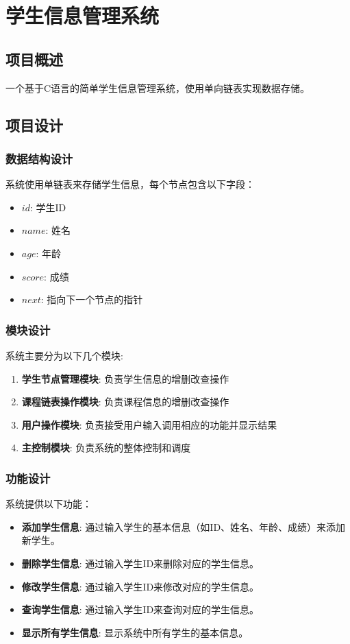 \chapter{学生信息管理系统}

\section{项目概述}
一个基于C语言的简单学生信息管理系统，使用单向链表实现数据存储。

\section{项目设计}
\subsection{数据结构设计}\label{sub:data_structure_design}
系统使用单链表来存储学生信息，每个节点包含以下字段：
\begin{itemize}
    \item $id$: 学生ID
    \item $name$: 姓名
    \item $age$: 年龄
    \item $score$: 成绩
    \item $next$: 指向下一个节点的指针
\end{itemize}

\subsection{模块设计}

系统主要分为以下几个模块: 

\begin{enumerate}
    \item \textbf{学生节点管理模块}: 负责学生信息的增删改查操作
    \item \textbf{课程链表操作模块}: 负责课程信息的增删改查操作
    \item \textbf{用户操作模块}: 负责接受用户输入调用相应的功能并显示结果
    \item \textbf{主控制模块}: 负责系统的整体控制和调度
\end{enumerate}

\subsection{功能设计}

系统提供以下功能：
\begin{itemize}
    \item \textbf{添加学生信息}: 通过输入学生的基本信息（如ID、姓名、年龄、成绩）来添加新学生。
    \item \textbf{删除学生信息}: 通过输入学生ID来删除对应的学生信息。
    \item \textbf{修改学生信息}: 通过输入学生ID来修改对应的学生信息。
    \item \textbf{查询学生信息}: 通过输入学生ID来查询对应的学生信息。
    \item \textbf{显示所有学生信息}: 显示系统中所有学生的基本信息。
\end{itemize}

